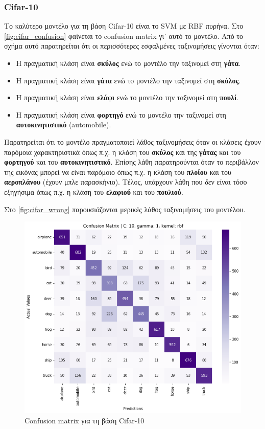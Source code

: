 \documentclass[a4paper]{article}
\begin{document}
\subsubsection{Cifar-10}

Το καλύτερο μοντέλο για τη βάση Cifar-10 είναι το SVM με RBF πυρήνα. Στο
\autoref{fig:cifar_confusion} φαίνεται το confusion matrix γι᾽ αυτό το μοντέλο.
Από το σχήμα αυτό παρατηρείται ότι οι περισσότερες εσφαλμένες ταξινομήσεις
γίνονται όταν:

\begin{itemize}
    \item Η πραγματική κλάση είναι {\bf σκύλος} ενώ το μοντέλο την ταξινομεί στη
        {\bf γάτα}.
    \item Η πραγματική κλάση είναι {\bf γάτα} ενώ το μοντέλο την ταξινομεί στη
        {\bf σκύλος}.
    \item Η πραγματική κλάση είναι {\bf ελάφι} ενώ το μοντέλο την ταξινομεί στη
        {\bf πουλί}.
    \item Η πραγματική κλάση είναι {\bf φορτηγό} ενώ το μοντέλο την ταξινομεί στη
        {\bf αυτοκινητιστικό} (automobile).
\end{itemize}

Παρατηρείται ότι το μοντέλο πραγματοποιεί λάθος ταξινομήσεις όταν οι κλάσεις
έχουν παρόμοια χαρακτηριστικά όπως π.χ. η κλάση του {\bf σκύλος} και της {\bf
γάτας} και του {\bf φορτηγού} και του {\bf αυτοκινητιστικό}. Επίσης λάθη
παρατηρούνται όταν το περιβάλλον της εικόνας μπορεί να είναι παρόμοιο όπως π.χ.
η κλάση του {\bf πλοίου} και του {\bf αεροπλάνου} (έχουν μπλε παρασκήνιο).
Τέλος, υπάρχουν λάθη που δεν είναι τόσο εξηγήσιμα όπως π.χ. η κλάση του {\bf
ελαφιού} και του {\bf πουλιού}.

Στο \autoref{fig:cifar_wrong} παρουσιάζονται μερικές λάθος ταξινομήσεις του
μοντέλου.

\begin{figure}[H]
    \centering
    \includegraphics[width=0.6\linewidth]{figures/cifar/confusion_matrix.png}
    \caption{Confusion matrix για τη βάση Cifar-10}
    \label{fig:cifar_confusion}
\end{figure}
\end{document}
